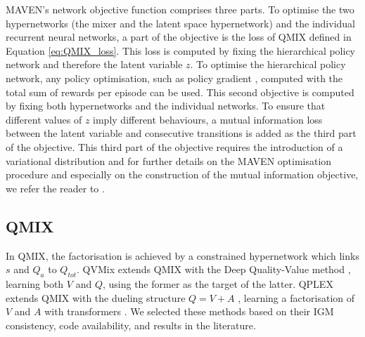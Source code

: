 MAVEN's network objective function comprises three parts.
To optimise the two hypernetworks (the mixer and the latent space hypernetwork) and the individual recurrent neural networks, a part of the objective is the loss of QMIX defined in Equation \ref{eq:QMIX_loss}.
This loss is computed by fixing the hierarchical policy network and therefore the latent variable $z$.
To optimise the hierarchical policy network, any policy optimisation, such as policy gradient \citep{NIPS1999_464d828b}, computed with the total sum of rewards per episode can be used.
This second objective is computed by fixing both hypernetworks and the individual networks.
To ensure that different values of $z$ imply different behaviours, a mutual information loss between the latent variable and consecutive transitions is added as the third part of the objective.
This third part of the objective requires the introduction of a variational distribution and for further details on the MAVEN optimisation procedure and especially on the construction of the mutual information objective, we refer the reader to \cite{Mahajan2019MAVEN:Exploration}.



\subsection{QMIX}

In QMIX, the factorisation is achieved by a constrained hypernetwork \citep{Ha2016HyperNetworks} which links $s$ and $Q_a$ to $Q_{tot}$.
QVMix \citep{leroy2020qvmix} extends QMIX with the Deep Quality-Value method \citep{sabatelli2018deepQV,sabatelli2020deep}, learning both $V$ and $Q$, using the former as the target of the latter.
QPLEX \citep{wang2021qplex} extends QMIX with the dueling structure $Q = V + A$ \citep{wang2016dueling}, learning a factorisation of $V$ and $A$ with transformers \citep{vaswani2017attention}.
We selected these methods based on their IGM consistency, code availability, and results in the literature.

